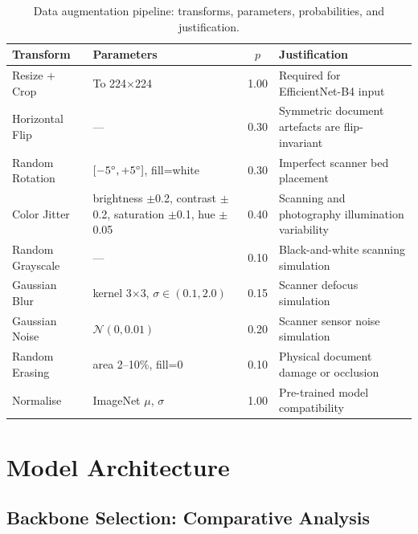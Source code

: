 \documentclass[12pt,a4paper,oneside]{report}
\begin{document}
\begin{table}[H]
\centering
\caption{Data augmentation pipeline: transforms, parameters, probabilities, and justification.}
\label{tab:aug_full}
\renewcommand{\arraystretch}{1.3}
\begin{tabularx}{\textwidth}{p{2.5cm}p{3.5cm}cX}
\toprule
\textbf{Transform} & \textbf{Parameters} & \textbf{$p$} & \textbf{Justification} \\
\midrule
Resize + Crop   & To 224$\times$224   & 1.00 & Required for EfficientNet-B4 input \\
Horizontal Flip & ---                 & 0.30 & Symmetric document artefacts are flip-invariant \\
Random Rotation & $[-5\degree, +5\degree]$, fill=white & 0.30 & Imperfect scanner bed placement \\
Color Jitter    & brightness $\pm$0.2, contrast $\pm$0.2, saturation $\pm$0.1, hue $\pm$0.05 & 0.40 & Scanning and photography illumination variability \\
Random Grayscale & ---                & 0.10 & Black-and-white scanning simulation \\
Gaussian Blur   & kernel 3$\times$3, $\sigma\in(0.1,2.0)$ & 0.15 & Scanner defocus simulation \\
Gaussian Noise  & $\mathcal{N}(0, 0.01)$ & 0.20 & Scanner sensor noise simulation \\
Random Erasing  & area 2--10\%, fill=0 & 0.10 & Physical document damage or occlusion \\
Normalise       & ImageNet $\mu$, $\sigma$ & 1.00 & Pre-trained model compatibility \\
\bottomrule
\end{tabularx}
\end{table}

\section{Model Architecture}
\label{sec:model}

\subsection{Backbone Selection: Comparative Analysis}
\end{document}
